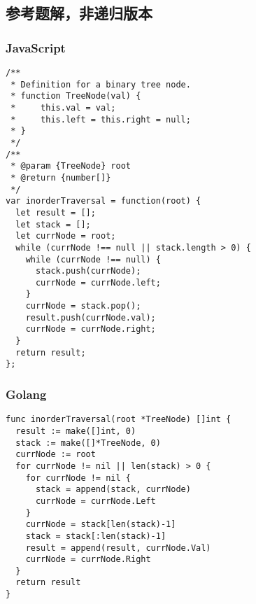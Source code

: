 \subsection{参考题解，非递归版本}

\subsubsection{JavaScript}

\begin{verbatim}
/**
 * Definition for a binary tree node.
 * function TreeNode(val) {
 *     this.val = val;
 *     this.left = this.right = null;
 * }
 */
/**
 * @param {TreeNode} root
 * @return {number[]}
 */
var inorderTraversal = function(root) {
  let result = [];
  let stack = [];
  let currNode = root;
  while (currNode !== null || stack.length > 0) {
    while (currNode !== null) {
      stack.push(currNode);
      currNode = currNode.left;
    }
    currNode = stack.pop();
    result.push(currNode.val);
    currNode = currNode.right;
  }
  return result;
};
\end{verbatim}

\subsubsection{Golang}

\begin{verbatim}
func inorderTraversal(root *TreeNode) []int {
  result := make([]int, 0)
  stack := make([]*TreeNode, 0)
  currNode := root
  for currNode != nil || len(stack) > 0 {
    for currNode != nil {
      stack = append(stack, currNode)
      currNode = currNode.Left
    }
    currNode = stack[len(stack)-1]
    stack = stack[:len(stack)-1]
    result = append(result, currNode.Val)
    currNode = currNode.Right
  }
  return result
}
\end{verbatim}

